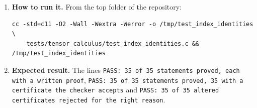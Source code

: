 \documentclass[11pt,a4paper]{article}
\begin{document}
\begin{enumerate}
\item \textbf{How to run it.} From the top folder of the repository:
\begin{verbatim}
cc -std=c11 -O2 -Wall -Wextra -Werror -o /tmp/test_index_identities \
    tests/tensor_calculus/test_index_identities.c && /tmp/test_index_identities
\end{verbatim}

\item \textbf{Expected result.} The lines \texttt{PASS: 35 of 35 statements proved, each with a written proof}, \texttt{PASS: 35 of 35 statements proved, 35 with a certificate the checker accepts} and \texttt{PASS: 35 of 35 altered certificates rejected for the right reason}.
\end{enumerate}
\end{document}
